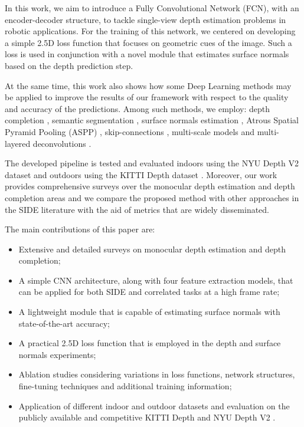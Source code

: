 \documentclass[5p]{elsarticle}
\begin{document}
In this work, we aim to introduce a Fully Convolutional Network (FCN), with an encoder-decoder structure, to tackle single-view depth estimation problems in robotic applications. For the training of this network, we centered on developing a simple 2.5D loss function that focuses on geometric cues of the image. Such a loss is used in conjunction with a novel module that estimates surface normals based on the depth prediction step.

At the same time, this work also shows how some Deep Learning methods may be applied to improve the results of our framework with respect to the quality and accuracy of the predictions. Among such methods, we employ: depth completion \cite{van2019sparse,ma2019self}, semantic segmentation \cite{guizilini2020semantically}, surface normals estimation \cite{yin2019enforcing}, Atrous Spatial Pyramid Pooling (ASPP) \cite{chen2017deeplab}, skip-connections \cite{lee2019big}, multi-scale models \cite{xu2017multi} and multi-layered deconvolutions \cite{alhashim2018high}.

The developed pipeline is tested and evaluated indoors using the NYU Depth V2 dataset \cite{silberman2011indoor} and outdoors using the KITTI Depth dataset \cite{uhrig2017sparsity}. Moreover, our work provides comprehensive surveys over the monocular depth estimation and depth completion areas and we compare the proposed method with other approaches in the SIDE literature with the aid of metrics that are widely disseminated.

The main contributions of this paper are:
\begin{itemize}
    \item Extensive and detailed surveys on monocular depth estimation and depth completion;
    \item A simple CNN architecture, along with four feature extraction models, that can be applied for both SIDE and correlated tasks at a high frame rate;
    \item A lightweight module that is capable of estimating surface normals with state-of-the-art accuracy;
    \item A practical 2.5D loss function that is employed in the depth and surface normals experiments;
    \item Ablation studies considering variations in loss functions, network structures, fine-tuning techniques and additional training information; 
    \item Application of different indoor and outdoor datasets and evaluation on the publicly available and competitive KITTI Depth \cite{uhrig2017sparsity} and NYU Depth V2 \cite{silberman2012indoor}.
\end{itemize}
 
\end{document}
